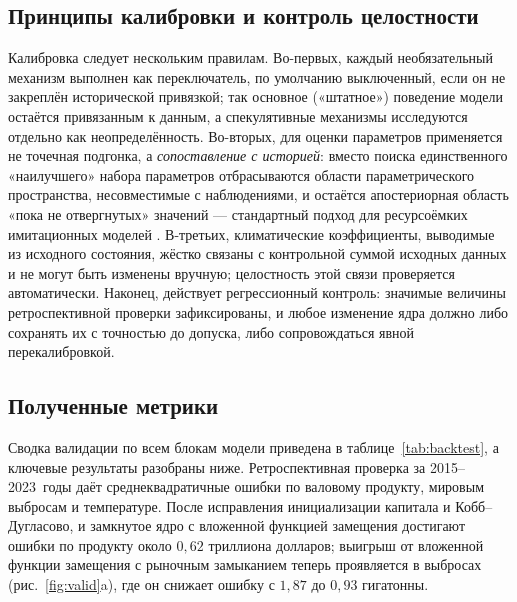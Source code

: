 \documentclass[11pt,a4paper]{article}
\begin{document}
\subsection{Принципы калибровки и контроль целостности}

Калибровка следует нескольким правилам. Во-первых, каждый необязательный механизм
выполнен как переключатель, по умолчанию выключенный, если он не закреплён исторической
привязкой; так основное («штатное») поведение модели остаётся привязанным к данным, а
спекулятивные механизмы исследуются отдельно как неопределённость. Во-вторых, для оценки
параметров применяется не точечная подгонка, а \emph{сопоставление с историей}: вместо
поиска единственного «наилучшего» набора параметров отбрасываются области параметрического
пространства, несовместимые с наблюдениями, и остаётся апостериорная область «пока не
отвергнутых» значений --- стандартный подход для ресурсоёмких имитационных моделей
\citep{williamson2013}.
В-третьих, климатические коэффициенты, выводимые из исходного состояния, жёстко связаны с
контрольной суммой исходных данных и не могут быть изменены вручную; целостность этой связи
проверяется автоматически. Наконец, действует регрессионный контроль: значимые величины
ретроспективной проверки зафиксированы, и любое изменение ядра должно либо сохранять их с
точностью до допуска, либо сопровождаться явной перекалибровкой.

\subsection{Полученные метрики}

Сводка валидации по всем блокам модели приведена в таблице~\ref{tab:backtest}, а ключевые
результаты разобраны ниже. Ретроспективная проверка за 2015--2023~годы даёт средне\-квадратичные
ошибки по валовому продукту, мировым выбросам и температуре. После исправления инициализации
капитала и Кобб--Дугласово, и замкнутое ядро с вложенной функцией замещения достигают ошибки по
продукту около $0{,}62$ триллиона долларов; выигрыш от вложенной функции замещения с рыночным
замыканием теперь проявляется в выбросах (рис.~\ref{fig:valid}a), где он снижает ошибку с $1{,}87$
до $0{,}93$ гигатонны.
\end{document}
